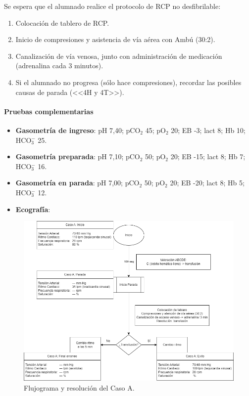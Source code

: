 Se espera que el alumnado realice el protocolo de RCP no desfibrilable:
\begin{enumerate}[topsep=0pt, partopsep=0pt,itemsep=0pt,parsep=0pt]
    \item Colocación de tablero de RCP.
    \item Inicio de compresiones y asistencia de vía aérea con Ambú (30:2).
    \item Canalización de vía venosa, junto con administración de medicación (adrenalina cada 3 minutos).
    \item Si el alumnado no progresa (sólo hace compresiones), recordar las posibles causas de parada (<<4H y 4T>>).
\end{enumerate}

\paragraph{Pruebas complementarias}
\begin{itemize}[topsep=0pt, partopsep=0pt,itemsep=0pt,parsep=0pt]
    \item\textbf{Gasometría de ingreso}: pH 7,40; pCO$_2$ 45; pO$_2$ 20; EB -3; lact 8; Hb 10; HCO$_3^-$ 25.
    \item \textbf{Gasometría preparada}: pH 7,10; pCO$_2$ 50; pO$_2$ 20; EB -15; lact 8; Hb 7; HCO$_3^-$ 16.
    \item \textbf{Gasometría en parada}: pH 7,00; pCO$_2$ 50; pO$_2$ 20; EB -20; lact 8; Hb 5; HCO$_3^-$ 12.
    \item \textbf{Ecografía}: %
\end{itemize}

\begin{figure}[hptb]
    \centering
	\includegraphics[width=\linewidth]{./imagenes/ACV-AdSC-CasosUCI_CasoA.png}
	\caption{\label{fig:Brusilov:SVI:CasoA}Flujograma y resolución del Caso A.}
\end{figure}
